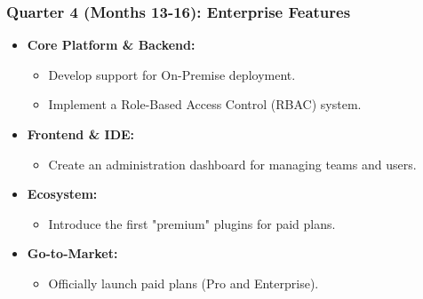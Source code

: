 \subsubsection*{Quarter 4 (Months 13-16): Enterprise Features}
\begin{itemize}[leftmargin=*]
    \item \textbf{Core Platform \& Backend:}
    \begin{itemize}
        \item Develop support for On-Premise deployment.
        \item Implement a Role-Based Access Control (RBAC) system.
    \end{itemize}
    \item \textbf{Frontend \& IDE:}
    \begin{itemize}
        \item Create an administration dashboard for managing teams and users.
    \end{itemize}
    \item \textbf{Ecosystem:}
    \begin{itemize}
        \item Introduce the first "premium" plugins for paid plans.
    \end{itemize}
    \item \textbf{Go-to-Market:}
    \begin{itemize}
        \item Officially launch paid plans (Pro and Enterprise).
    \end{itemize}
\end{itemize}

\clearpage

